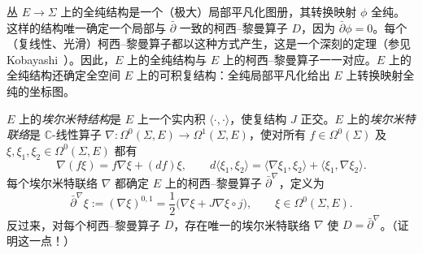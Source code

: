 \begin{remark}\label{rem:C-1-1}
丛 $E\to\Sigma$ 上的全纯结构是一个（极大）局部平凡化图册，其转换映射 $\phi$ 全纯。这样的结构唯一确定一个局部与 $\bar\partial$ 一致的柯西–黎曼算子 $D$，因为 $\bar\partial\phi=0$。每个（复线性、光滑）柯西–黎曼算子都以这种方式产生，这是一个深刻的定理（参见 Kobayashi~）。因此，$E$ 上的全纯结构与 $E$ 上的柯西–黎曼算子一一对应。$E$ 上的全纯结构还确定全空间 $E$ 上的可积复结构：全纯局部平凡化给出 $E$ 上转换映射全纯的坐标图。
\end{remark}

\begin{remark}\label{rem:C-1-2}
$E$ 上的\emph{埃尔米特结构}是 $E$ 上一个实内积 $\langle\cdot,\cdot\rangle$，使复结构 $J$ 正交。$E$ 上的\emph{埃尔米特联络}是 $\mathbb C$-线性算子 $\nabla:\Omega^0(\Sigma,E)\to\Omega^1(\Sigma,E)$，使对所有 $f\in\Omega^0(\Sigma)$ 及 $\xi,\xi_1,\xi_2\in\Omega^0(\Sigma,E)$ 都有
\[
  \nabla(f\xi)=f\nabla\xi+(df)\xi,\qquad
  d\langle\xi_1,\xi_2\rangle
  =\langle\nabla\xi_1,\xi_2\rangle+\langle\xi_1,\nabla\xi_2\rangle.
\]
每个埃尔米特联络 $\nabla$ 都确定 $E$ 上的柯西–黎曼算子 $\bar\partial^\nabla$，定义为
\[
  \bar\partial^\nabla\xi:=(\nabla\xi)^{0,1}
  =\frac12\bigl(\nabla\xi+J\nabla\xi\circ j\bigr),
  \qquad \xi\in\Omega^0(\Sigma,E).
\]
反过来，对每个柯西–黎曼算子 $D$，存在唯一的埃尔米特联络 $\nabla$ 使 $D=\bar\partial^\nabla$。（证明这一点！）
\end{remark}

